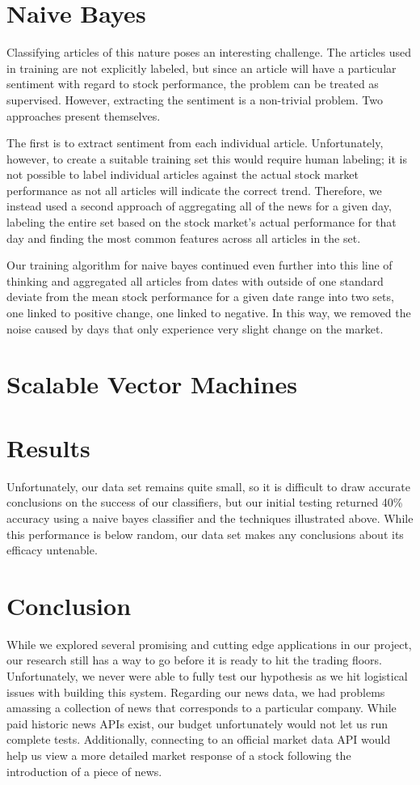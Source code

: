 \documentclass[letterpaper]{article}
\begin{document}
\section{Naive Bayes}
\noindent Classifying articles of this nature poses an interesting challenge. The articles used in training are not explicitly labeled, but since an article will have a particular sentiment with regard to stock performance, the problem can be treated as supervised. However, extracting the sentiment is a non-trivial problem. Two approaches present themselves. 

The first is to extract sentiment from each individual article. Unfortunately, however, to create a suitable training set this would require human labeling; it is not possible to label individual articles against the actual stock market performance as not all articles will indicate the correct trend. Therefore, we instead used a second approach of aggregating all of the news for a given day, labeling the entire set based on the stock market’s actual performance for that day and finding the most common features across all articles in the set. 

Our training algorithm for naive bayes continued even further into this line of thinking and aggregated all articles from dates with outside of one standard deviate from the mean stock performance for a given date range into two sets, one linked to positive change, one linked to negative. In this way, we removed the noise caused by days that only experience very slight change on the market.

\section{Scalable Vector Machines}
\noindent

\section{Results}

\noindent Unfortunately, our data set remains quite small, so it is difficult to draw accurate conclusions on the success of our classifiers, but our initial testing returned 40\% accuracy using a naive bayes classifier and the techniques illustrated above. While this performance is below random, our data set makes any conclusions about its efficacy untenable.

\section{Conclusion}
\noindent While we explored several promising and cutting edge applications in our project, our research still has a way to go before it is ready to hit the trading floors. Unfortunately, we never were able to fully test our hypothesis as we hit logistical issues with building this system. Regarding our news data, we had problems amassing a collection of news that corresponds to a particular company. While paid historic news APIs exist, our budget unfortunately would not let us run complete tests. Additionally, connecting to an official market data API would help us view a more detailed market response of a stock following the introduction of a piece of news.
\end{document}
